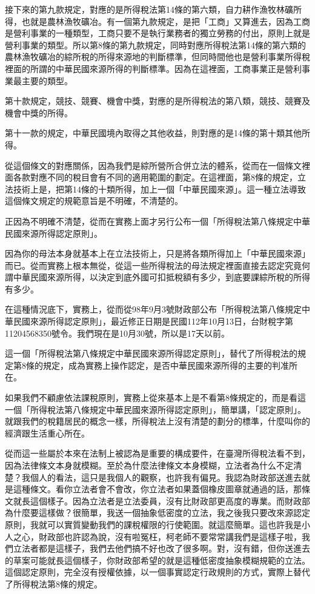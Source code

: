 \documentclass[]{ctexbook}
\begin{document}
接下來的第九款規定，對應的是所得稅法第14條的第六類，自力耕作漁牧林礦所得，也就是農林漁牧礦冶。有一個第九款規定，是把「工商」又算進去，因為工商是營利事業的一種類型，工商只要不是執行業務者的獨立勞務的付出，原則上就是營利事業的類型。所以第8條的第九款規定，同時對應所得稅法第14條的第六類的農林漁牧礦冶的綜所稅的所得來源地的判斷標準，但同時間他也是營利事業所得稅裡面的所謂的中華民國來源所得的判斷標準。因為在這裡面，工商事業正是營利事業最主要的類型。

第十款規定，競技、競賽、機會中獎，對應的是所得稅法的第八類，競技、競賽及機會中獎的所得。

第十一款的規定，中華民國境內取得之其他收益，則對應的是14條的第十類其他所得。

從這個條文的對應關係，因為我們是綜所營所合併立法的體系，從而在一個條文裡面各款對應不同的稅目會有不同的適用範圍的劃定。在這裡面，第8條的規定，立法技術上是，把第14條的十類所得，加上一個「中華民國來源」。這一種立法導致這個條文規定的規範意旨是不明確，不清楚的。

正因為不明確不清楚，從而在實務上面才另行公布一個「所得稅法第八條規定中華民國來源所得認定原則」。

因為你的母法本身就基本上在立法技術上，只是將各類所得加上「中華民國來源」而已。從而實務上根本無從，從這一些所得稅法的母法規定裡面直接去認定究竟何謂中華民國來源所得，以決定到底外國可扣抵稅額有多少，到底要課綜所稅的所得有多少。

在這種情況底下，實務上，從而從98年9月3號財政部公布「所得稅法第八條規定中華民國來源所得認定原則」，最近修正日期是民國112年10月13日，台財稅字第11204568350號令。我們現在是10月30號，所以是17天以前。

這一個「所得稅法第八條規定中華民國來源所得認定原則」，替代了所得稅法的規定第8條的規定，成為實務上操作認定，是否中華民國來源所得的主要的判准所在。

如果我們不顧慮依法課稅原則，實務上從來基本上是不看第8條規定的，而是看這一個「所得稅法第八條規定中華民國來源所得認定原則」，簡單講，「認定原則」。就跟我們的稅籍居民的概念一樣，所得稅法上沒有清楚的劃分的標準，什麼叫你的經濟跟生活重心所在。

從而這一些屬於本來在法制上被認為是重要的構成要件，在臺灣所得稅法看不到，因為法律條文本身就模糊。至於為什麼法律條文本身模糊，立法者為什么不定清楚？我個人的看法，這只是我個人的觀察，也許我有偏見。我認為財政部送進去就是這種條文。看你立法者會不會改，你立法者如果蓋個橡皮圖章就通過的話，那條文就長這個樣子。因為立法者是立法委員，沒有比財政部更高度的專業。而財政部為什麼要這樣做？很簡單，我送一個抽象低密度的立法，我之後我只要改來源認定原則，我就可以實質變動我們的課稅權限的行使範圍。就這麼簡單。這也許我是小人之心，財政部也許認為說，沒有啦冤枉，柯老師不要常常講我們是這樣子啦，我們立法者都是這樣子，我們去他們搞不好也改了很多啊。對，沒有錯，但你送進去的草案可能就長這個樣子，你財政部希望的就是這種低密度抽象模糊規範的立法。這個認定原則，完全沒有授權依據，以一個事實認定行政規則的方式，實際上替代了所得稅法第8條的規定。
\end{document}
